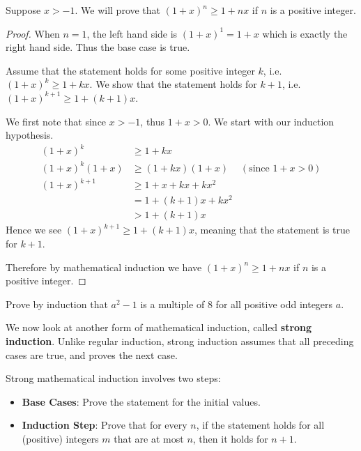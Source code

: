 \begin{example}
    Suppose $x > -1$. We will prove that $(1+x)^n \geq 1+nx$ if $n$ is a positive integer.
    \begin{proof}
        When $n = 1$, the left hand side is $(1+x)^1 = 1+x$ which is exactly the right hand side. Thus the base case is true.
        
        Assume that the statement holds for some positive integer $k$, i.e. $(1+x)^k \geq 1+kx$. We show that the statement holds for $k+1$, i.e. $(1+x)^{k+1} \geq 1+(k+1)x$.
        
        We first note that since $x>-1$, thus $1+x > 0$. We start with our induction hypothesis.
        \begin{align*}
            (1+x)^k &\geq 1+kx\\
            (1+x)^k(1+x) &\geq (1+kx)(1+x) & (\text{since }1+x > 0)\\
            (1+x)^{k+1} &\geq 1 + x + kx + kx^2\\
            &= 1+(k+1)x + kx^2\\
            &> 1+(k+1)x
        \end{align*}
        Hence we see $(1+x)^{k+1} \geq 1+(k+1)x$, meaning that the statement is true for $k+1$.
        
        Therefore by mathematical induction we have $(1+x)^n \geq 1+nx$ if $n$ is a positive integer.
    \end{proof}
\end{example}

\begin{exercise}
    Prove by induction that $a^2 - 1$ is a multiple of 8 for all positive odd integers $a$.
\end{exercise}

We now look at another form of mathematical induction, called \textbf{strong induction}. Unlike regular induction, strong induction assumes that all preceding cases are true, and proves the next case.

Strong mathematical induction involves two steps:
\begin{itemize}
    \item \textbf{Base Cases}: Prove the statement for the initial values.
    \item \textbf{Induction Step}: Prove that for every $n$, if the statement holds for all (positive) integers $m$ that are at most $n$, then it holds for $n + 1$.
\end{itemize}

